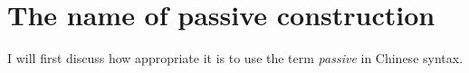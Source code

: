 \documentclass[../main.tex]{subfiles}
\begin{document}
\section{The name of passive construction}\label{sec:passive-cross-linguistic}

I will first discuss how appropriate it is to use the term \emph{passive} in Chinese syntax.

\citep{meiguang2018}
\end{document}
